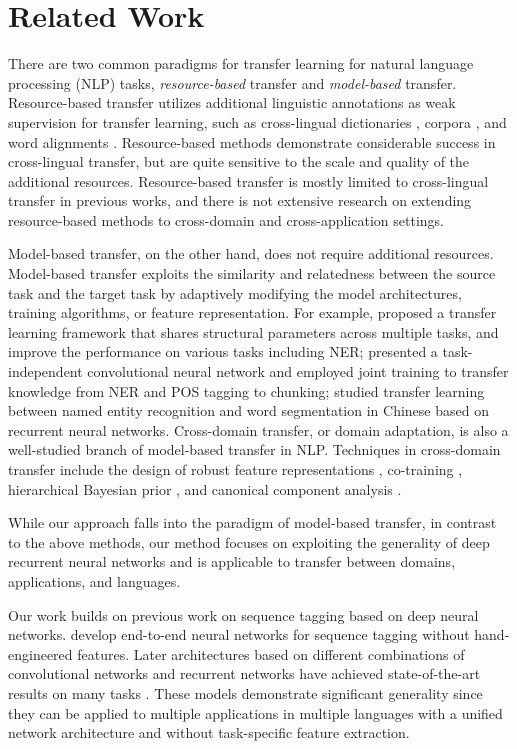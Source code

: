 
\section{Related Work}

There are two common paradigms for transfer learning for natural language processing (NLP) tasks, \textit{resource-based} transfer and \textit{model-based} transfer. Resource-based transfer utilizes additional linguistic annotations as weak supervision for transfer learning, such as cross-lingual dictionaries \citep{zirikly2cross}, corpora \citep{wang2013cross}, and word alignments \citep{yarowsky2001inducing}. Resource-based methods demonstrate considerable success in cross-lingual transfer, but are quite sensitive to the scale and quality of the additional resources. Resource-based transfer is mostly limited to cross-lingual transfer in previous works, and there is not extensive research on extending resource-based methods to cross-domain and cross-application settings.

Model-based transfer, on the other hand, does not require additional resources. Model-based transfer exploits the similarity and relatedness between the source task and the target task by adaptively modifying the model architectures, training algorithms, or feature representation. For example, \cite{ando2005framework} proposed a transfer learning framework that shares structural parameters across multiple tasks, and improve the performance on various tasks including NER; \cite{collobert2011natural} presented a task-independent convolutional neural network and employed joint training to transfer knowledge from NER and POS tagging to chunking; \cite{pengimproving} studied transfer learning between named entity recognition and word segmentation in Chinese based on recurrent neural networks. Cross-domain transfer, or domain adaptation, is also a well-studied branch of model-based transfer in NLP. Techniques in cross-domain transfer include the design of robust feature representations \citep{schnabel2014flors}, co-training \citep{chen2011co}, hierarchical Bayesian prior \citep{finkel2009hierarchical}, and canonical component analysis \citep{kim2015new}.

While our approach falls into the paradigm of model-based transfer, in contrast to the above methods, our method focuses on exploiting the generality of deep recurrent neural networks and is applicable to transfer between domains, applications, and languages.

Our work builds on previous work on sequence tagging based on deep neural networks. \cite{collobert2011natural} develop end-to-end neural networks for sequence tagging without hand-engineered features. Later architectures based on different combinations of convolutional networks and recurrent networks have achieved state-of-the-art results on many tasks \citep{collobert2011natural,huang2015bidirectional,chiu2015named,lample2016neural,ma2016end}. These models demonstrate significant generality since they can be applied to multiple applications in multiple languages with a unified network architecture and without task-specific feature extraction.

